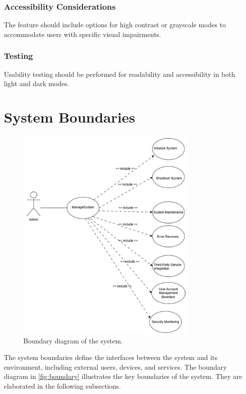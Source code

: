 \documentclass[twoside,a4paper,journal]{IEEEtran}
\begin{document}
\subsubsection{Accessibility Considerations}
The feature should include options for high contrast or grayscale modes to
accommodate users with specific visual impairments.

\subsubsection{Testing}
Usability testing should be performed for readability and accessibility in both
light and dark modes.

\section{System Boundaries}
\begin{figure}[!t]
\centering
\includegraphics[width=3.5in]{boundary}
\caption{Boundary diagram of the system.}
\label{fig:boundary}
\end{figure}

The system boundaries define the interfaces between the system and its
environment, including external users, devices, and services.
The boundary diagram in \autoref{fig:boundary} illustrates the key boundaries
of the system.
They are elaborated in the following subsections.
\end{document}
